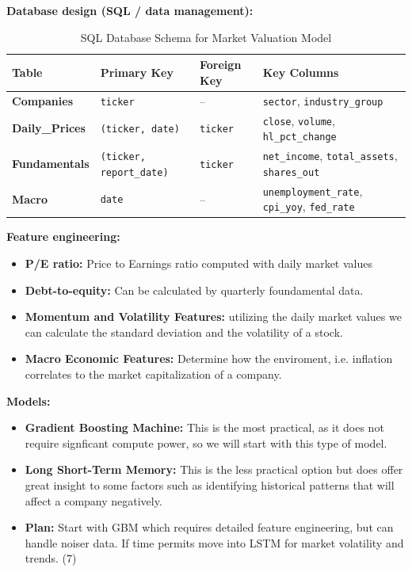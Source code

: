 \documentclass[12pt]{article}
\begin{document}
\noindent\textbf{Database design (SQL / data management):}\\
\begin{table}[h]
\centering
\caption{SQL Database Schema for Market Valuation Model}
\label{tab:database_schema}
\begin{tabular}{@{}llll@{}}
\toprule
\textbf{Table} & \textbf{Primary Key} & \textbf{Foreign Key} & \textbf{Key Columns} \\ \midrule
\textbf{Companies} & \texttt{ticker} & -- & \texttt{sector}, \texttt{industry\_group} \\
\textbf{Daily\_Prices} & \texttt{(ticker, date)} & \texttt{ticker} & \texttt{close}, \texttt{volume}, \texttt{hl\_pct\_change} \\
\textbf{Fundamentals} & \texttt{(ticker, report\_date)} & \texttt{ticker} & \texttt{net\_income}, \texttt{total\_assets}, \texttt{shares\_out} \\
\textbf{Macro} & \texttt{date} & -- & \texttt{unemployment\_rate}, \texttt{cpi\_yoy}, \texttt{fed\_rate} \\ \bottomrule
\end{tabular}
\end{table}


\noindent\textbf{Feature engineering:}\\
\begin{itemize}
  \item \textbf{P/E ratio:} Price to Earnings ratio computed with daily market values
  \item \textbf{Debt-to-equity:} Can be calculated by quarterly foundamental data.
  \item \textbf{Momentum and Volatility Features:}  utilizing the daily market values we can calculate the standard deviation and the volatility of a stock.
  \item \textbf{Macro Economic Features:}  Determine how the enviroment, i.e. inflation correlates to the market capitalization of a company.
\end{itemize}

\noindent\textbf{Models:}\\
\begin{itemize}
  \item \textbf{Gradient Boosting Machine:} This is the most practical, as it does not require signficant compute power, so we will start with this type of model.
  \item \textbf{Long Short-Term Memory:} This is the less practical option but does offer great insight to some factors such as identifying historical patterns that will affect a company negatively.
  \item \textbf{Plan:} Start with GBM which requires detailed feature engineering, but can handle noiser data. If time permits move into LSTM for market volatility and trends. (7)
\end{itemize}
\end{document}
